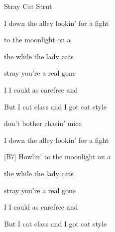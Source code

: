 \begin{SBSong}{Stray Cat Strut}
\begin{SBVerse}
    I  down the alley lookin' for a fight 
    
     to the moonlight on a    
    
     the  while the  lady cats 
    
     stray  you're a  real gone  
    
    I  I could  as  carefree and  
    
    But I  cat class and I got cat style 
  \end{SBVerse}
  \begin{SBVerse}
     don't bother chasin' mice 
    
    I  down the alley lookin' for a fight 
    
    [B7] Howlin' to the moonlight on a    
    
     the  while the  lady cats 
    
     stray  you're a  real gone  
    
    I  I could  as  carefree and  
    
    But I  cat class and I got cat style 
  \end{SBVerse}
\end{SBSong}